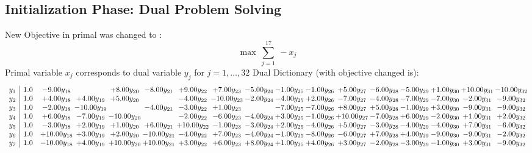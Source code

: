 \documentclass[9pt]{article}
\begin{document}
\subsection{Initialization Phase: Dual Problem Solving}
New Objective in primal was changed to : \[ \max\ \sum_{j=1}^{17}\ - x_j \] 
Primal variable $x_j$ corresponds to dual variable $y_j$ for $j = 1,\ldots,32$
Dual Dictionary (with objective changed is): 
\[\begin{array}{c| c c@{\hskip 2pt} c@{\hskip 2pt} c@{\hskip 2pt} c@{\hskip 2pt} c@{\hskip 2pt} c@{\hskip 2pt} c@{\hskip 2pt} c@{\hskip 2pt} c@{\hskip 2pt} c@{\hskip 2pt} c@{\hskip 2pt} c@{\hskip 2pt} c@{\hskip 2pt} c@{\hskip 2pt} c@{\hskip 2pt} }
 y_{1}   &  1.0 & -9.00 y_{18} &   & +  8.00 y_{20} & -8.00 y_{21} & +  9.00 y_{22} & +  7.00 y_{23} & -5.00 y_{24} & -1.00 y_{25} & -1.00 y_{26} & +  5.00 y_{27} & -6.00 y_{28} & -5.00 y_{29} & +  1.00 y_{30} & + 10.00 y_{31} & -10.00 y_{32}\\
 y_{2}   &  1.0 & +  4.00 y_{18} & +  4.00 y_{19} & +  5.00 y_{20} &   & -4.00 y_{22} & -10.00 y_{23} & -2.00 y_{24} & -4.00 y_{25} & +  2.00 y_{26} & -7.00 y_{27} & -4.00 y_{28} & -7.00 y_{29} & -7.00 y_{30} & -2.00 y_{31} & -9.00 y_{32}\\
 y_{3}   &  1.0 & -2.00 y_{18} & -10.00 y_{19} &   & -4.00 y_{21} & -3.00 y_{22} & +  1.00 y_{23} &   & -7.00 y_{25} & -7.00 y_{26} & +  8.00 y_{27} & +  5.00 y_{28} & -1.00 y_{29} & +  3.00 y_{30} & -9.00 y_{31} & -9.00 y_{32}\\
 y_{4}   &  1.0 & +  6.00 y_{18} & -7.00 y_{19} & -10.00 y_{20} &   & -2.00 y_{22} & -6.00 y_{23} & -4.00 y_{24} & +  3.00 y_{25} & -1.00 y_{26} & + 10.00 y_{27} & -7.00 y_{28} & +  6.00 y_{29} & -2.00 y_{30} & +  1.00 y_{31} & +  2.00 y_{32}\\
 y_{5}   &  1.0 & -3.00 y_{18} & +  2.00 y_{19} & +  1.00 y_{20} & +  6.00 y_{21} & + 10.00 y_{22} & -1.00 y_{23} & -3.00 y_{24} & +  2.00 y_{25} & -4.00 y_{26} & +  5.00 y_{27} & -3.00 y_{28} & -4.00 y_{29} & -4.00 y_{30} & +  7.00 y_{31} & -6.00 y_{32}\\
 y_{6}   &  1.0 & + 10.00 y_{18} & +  3.00 y_{19} & +  2.00 y_{20} & -10.00 y_{21} & -4.00 y_{22} & +  7.00 y_{23} & -4.00 y_{24} & -1.00 y_{25} & -8.00 y_{26} & -6.00 y_{27} & +  7.00 y_{28} & +  4.00 y_{29} & -9.00 y_{30} & -9.00 y_{31} & -2.00 y_{32}\\
 y_{7}   &  1.0 & -10.00 y_{18} & +  4.00 y_{19} & + 10.00 y_{20} & + 10.00 y_{21} & +  3.00 y_{22} & +  6.00 y_{23} & +  8.00 y_{24} & +  1.00 y_{25} & +  4.00 y_{26} & +  3.00 y_{27} & -2.00 y_{28} & -3.00 y_{29} & -1.00 y_{30} & +  3.00 y_{31} & -9.00 y_{32}\\

\end{array}\]
\end{document}
